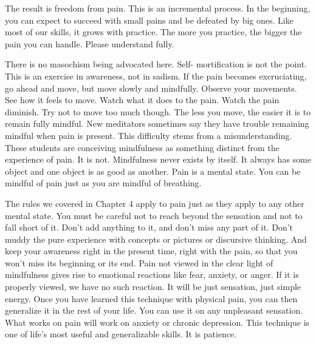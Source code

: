 The result is freedom from pain.
This is an incremental process. In the beginning, you can expect to succeed with small pains and be defeated by big ones. Like
most of our skills, it grows with practice. The more you practice, the bigger the pain you can handle. Please understand fully.

There is no masochism being advocated here. Self- mortification is not the
point.
This is an exercise in awareness, not in sadism. If the pain becomes excruciating, go ahead and move, but move slowly and
mindfully. Observe your movements. See how it feels to move. Watch what it does to the pain. Watch the pain diminish. Try not
to move too much though. The less you move, the easier it is to remain fully mindful. New meditators sometimes say they have
trouble remaining mindful when pain is present. This difficulty stems from a misunderstanding. These students are conceiving
mindfulness as something distinct from the experience of pain. It is not. Mindfulness never exists by itself. It always has some
object and one object is as good as another. Pain is a mental state. You can be mindful of pain just as you are mindful of
breathing.

The rules we covered in Chapter 4 apply to pain just as they apply to any other
mental state. You must be careful not to reach beyond the sensation and not to
fall short of it. Don't add anything to it, and don't miss any part of it. Don't
muddy the pure experience with concepts or pictures or discursive thinking. And
keep your awareness right in the present time, right with the pain, so that you
won't miss its beginning or its end. Pain not viewed in the clear light of
mindfulness gives rise to emotional reactions like fear, anxiety, or anger. If
it is properly viewed, we have no such reaction. It will be just sensation, just
simple energy. Once you have learned this technique with physical pain, you can then
generalize it in the rest of your life. You can use it on any unpleasant
sensation. What works on pain will work on anxiety or chronic depression. This
technique is one of life's most useful and generalizable skills. It is patience.

